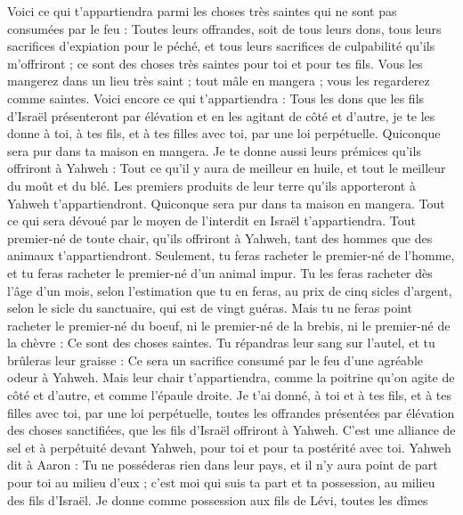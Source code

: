 \begin{multicols}{2}
Voici ce qui t'appartiendra parmi les choses très saintes qui ne sont pas consumées par le feu : Toutes leurs offrandes, soit de tous leurs dons, tous leurs sacrifices d’expiation pour le péché, et tous leurs sacrifices de culpabilité qu’ils m’offriront ; ce sont des choses très saintes pour toi et pour tes fils.
Vous les mangerez dans un lieu très saint ; tout mâle en mangera ; vous les regarderez comme saintes.
Voici encore ce qui t'appartiendra : Tous les dons que les fils d'Israël présenteront par élévation et en les agitant de côté et d’autre, je te les donne à toi, à tes fils, et à tes filles avec toi, par une loi perpétuelle. Quiconque sera pur dans ta maison en mangera.
Je te donne aussi leurs prémices qu'ils offriront à Yahweh : Tout ce qu’il y aura de meilleur en huile, et tout le meilleur du moût et du blé.
Les premiers produits de leur terre qu'ils apporteront à Yahweh t'appartiendront. Quiconque sera pur dans ta maison en mangera.
Tout ce qui sera dévoué par le moyen de l’interdit en Israël t'appartiendra.
Tout premier-né de toute chair, qu'ils offriront à Yahweh, tant des hommes que des animaux t'appartiendront. Seulement, tu feras racheter le premier-né de l'homme, et tu feras racheter  le premier-né d’un animal impur.
Tu les feras racheter dès l'âge d'un mois, selon l'estimation que tu en feras, au prix de cinq sicles d'argent, selon le sicle du sanctuaire, qui est de vingt guéras.
Mais tu ne feras point racheter le premier-né du boeuf, ni le premier-né de la brebis, ni le premier-né de la chèvre : Ce sont des choses saintes. Tu répandras leur sang sur l'autel, et tu brûleras leur graisse : Ce sera un sacrifice consumé par le feu d’une agréable odeur à Yahweh.
Mais leur chair t'appartiendra, comme la poitrine qu’on agite de côté et d’autre, et comme l'épaule droite.
Je t'ai donné, à toi et à tes fils, et à tes filles avec toi, par une loi perpétuelle, toutes les offrandes présentées par élévation des choses sanctifiées, que les fils d'Israël offriront à Yahweh. C’est une alliance de sel et à perpétuité devant Yahweh, pour toi et pour ta postérité avec toi.
Yahweh dit à Aaron : Tu ne posséderas rien dans leur pays, et il n’y aura point de part pour toi au milieu d’eux ; c’est moi qui suis ta part et ta possession, au milieu des fils d'Israël.
Je donne comme possession aux fils de Lévi, toutes les dîmes
\end{multicols}
